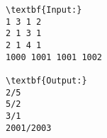 \begin{verbatim}
\textbf{Input:}
1 3 1 2
2 1 3 1
2 1 4 1
1000 1001 1001 1002

\textbf{Output:}
2/5
5/2
3/1
2001/2003
\end{verbatim}
